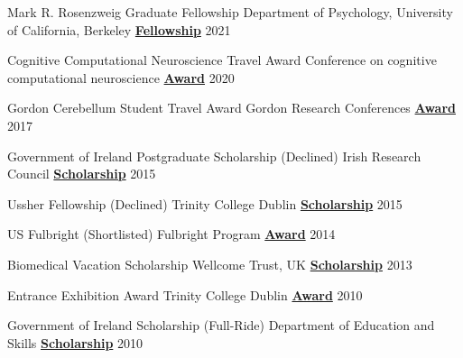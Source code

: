 

\begin{cvhonors}

 \cvhonor
    {Mark R. Rosenzweig Graduate Fellowship} %
    {Department of Psychology, University of California, Berkeley}
    {\href{https://psychology.berkeley.edu/give/endowed-funds}{\textbf{Fellowship}}}
  	{2021}
  
 \cvhonor
   {Cognitive Computational Neuroscience Travel Award}
   {Conference on cognitive computational neuroscience}
   {\href{https://2021.ccneuro.org/index.php}{\textbf{Award}}}
   {2020}
   
 \cvhonor
   {Gordon Cerebellum Student Travel Award}
   {Gordon Research Conferences}
   {\href{https://www.grc.org/cerebellum-grs-conference/2017/}{\textbf{Award}}}
   {2017}
   
 \cvhonor
   {Government of Ireland Postgraduate Scholarship (Declined)}
   {Irish Research Council}
   {\href{https://research.ie/funding/goipg/}{\textbf{Scholarship}}}
   {2015}
   
 \cvhonor
   {Ussher Fellowship (Declined)}
   {Trinity College Dublin}
   {\href{https://www.tcd.ie/study/international/scholarships/Postgraduate/ussher.php}{\textbf{Scholarship}}}
   {2015}
   
   
 \cvhonor
   {US Fulbright (Shortlisted)}
   {Fulbright Program}
   {\href{https://www.fulbright.ie/going-to-the-usa/fulbright-irish-scholar-awards/}{\textbf{Award}}}
   {2014}
   
  \cvhonor
   {Biomedical Vacation Scholarship}
   {Wellcome Trust, UK}
   {\href{https://wellcome.org/}{\textbf{Scholarship}}}
   {2013}
   
  \cvhonor
   {Entrance Exhibition Award}
   {Trinity College Dublin}
   {\href{https://www.tcd.ie/study/undergraduate/entrance-exhibition/}{\textbf{Award}}}
   {2010}
   
  \cvhonor
   {Government of Ireland Scholarship (Full-Ride)}
   {Department of Education and Skills}
   {\href{ https://www.gov.ie/en/service/third-level-scholarships/}{\textbf{Scholarship}}}
   {2010}

\end{cvhonors}
